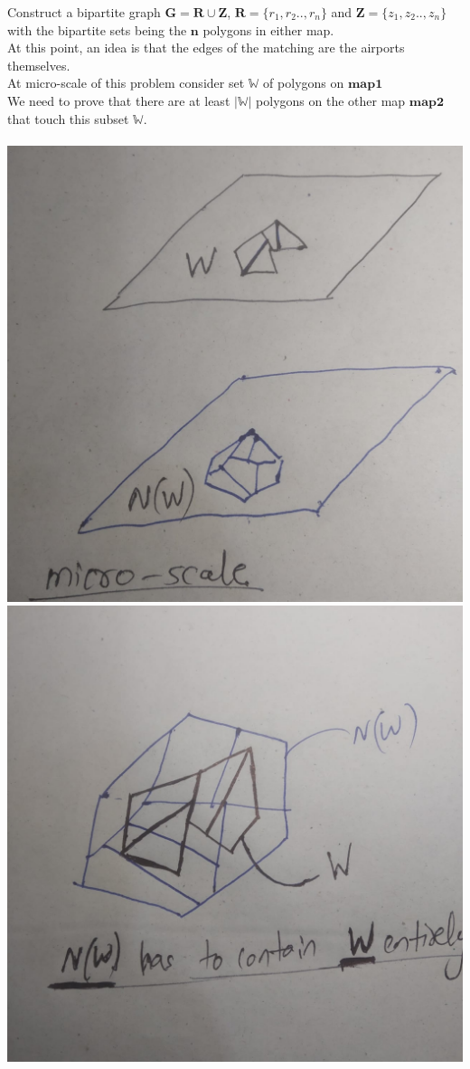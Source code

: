 \documentclass[11pt]{exam}
\begin{document}
\begin{questions}
\begin{solution}
    Construct a bipartite graph $\pmb{G} = \pmb{R} \cup \pmb{Z}$, $\pmb{R} = \{ r_1, r_2 . ., r_n \}$ and $\pmb{Z} = \{ z_1, z_2 . ., z_n \}$ with the bipartite sets being the $\pmb{n}$ polygons in either map.\\
    
    At this point, an idea is that the edges of the matching are the airports themselves.\\
    At micro-scale of this problem consider set $\mathbb{W}$ of polygons on $\pmb{map1}$ \\
    We need to prove that there are at least $|\mathbb{W}|$ polygons on the other map $\pmb{map2}$ that touch this subset $\mathbb{W}$.\\
    \\
    \includegraphics[scale=0.15]{fig1.jpeg} \includegraphics[scale=0.15]{fig2.jpeg}

\end{solution}
\end{questions}
\end{document}

